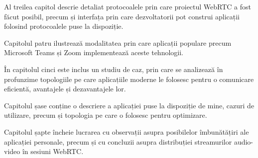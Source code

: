 \indent \par Al treilea capitol descrie detaliat protocoalele prin care proiectul WebRTC a fost făcut posibil, precum și interfața prin care dezvoltatorii pot construi aplicații folosind protocoalele puse la dispoziție.
\indent \par Capitolul patru ilustrează modalitatea prin care aplicații populare precum Microsoft Teams și Zoom implementează aceste tehnologii.
\indent \par În capitolul cinci este inclus un studiu de caz, prin care se analizează în profunzime topologiile pe care aplicațiile moderne le folosesc pentru o comunicare eficientă, avantajele și dezavantajele lor.
\indent \par Capitolul șase conține o descriere a aplicației puse la dispoziție de mine, cazuri de utilizare, precum și topologia pe care o folosesc pentru optimizare.
\indent \par Capitolul șapte încheie lucrarea cu observații asupra posibilelor îmbunătățiri ale aplicației personale, precum și cu concluzii asupra distribuției streamurilor audio-video în sesiuni WebRTC.